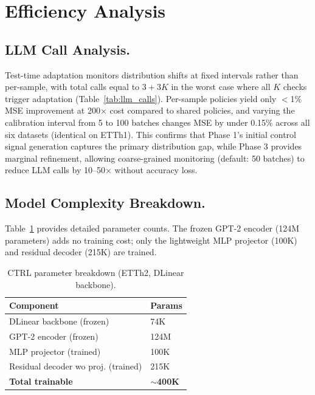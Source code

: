\section{Efficiency Analysis}
\label{app:efficiency}

\subsection{LLM Call Analysis.}
Test-time adaptation monitors distribution shifts at fixed intervals rather than per-sample, with total calls equal to $3 + 3K$ in the worst case where all $K$ checks trigger adaptation (Table~\ref{tab:llm_calls}). Per-sample policies yield only $<$1\% MSE improvement at 200$\times$ cost compared to shared policies, and varying the calibration interval from 5 to 100 batches changes MSE by under 0.15\% across all six datasets (identical on ETTh1). This confirms that Phase 1's initial control signal generation captures the primary distribution gap, while Phase 3 provides marginal refinement, allowing coarse-grained monitoring (default: 50 batches) to reduce LLM calls by 10--50$\times$ without accuracy loss.




\subsection{Model Complexity Breakdown.}
Table~\ref{tab:param_breakdown} provides detailed parameter counts.
The frozen GPT-2 encoder (124M parameters) adds no training cost; 
only the lightweight MLP projector (100K) and residual decoder (215K) are trained.

\begin{table}[H]
\centering

\small
\begin{tabular}{p{4.5cm}p{1.2cm}}
\toprule
\textbf{Component} & \textbf{Params} \\
\midrule
DLinear backbone (frozen) & 74K \\
GPT-2 encoder (frozen) & 124M \\
MLP projector (trained) & 100K \\
Residual decoder wo proj. (trained) & 215K \\
\midrule
\textbf{Total trainable} & \textbf{$\sim$400K} \\
\bottomrule
\end{tabular}
\caption{CTRL parameter breakdown (ETTh2, DLinear backbone).}
\label{tab:param_breakdown}
\end{table}







